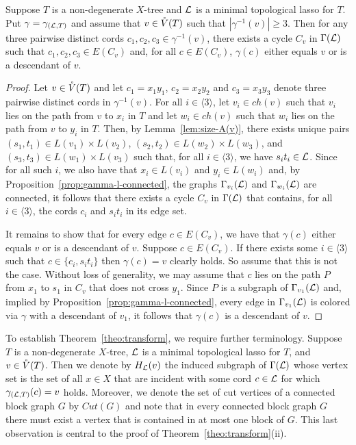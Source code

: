 \begin{lem}\label{lem:3-edges-cycle}
Suppose $T$ is a non-degenerate $X$-tree and ${\mathcal L}$ is a minimal
topological lasso for $T$.  Put $\gamma=\gamma_{({\mathcal L},T)}$ and assume that
$v\in \mathring{V}(T)$ such that $|\gamma^{-1}(v)|\geq 3 $. Then for any three
pairwise distinct cords $c_1,c_2,c_3\in \gamma^{-1}(v)$, 
there exists a 
cycle $C_v$ in $\Gamma({\mathcal L})$ such that $c_1,c_2,c_3\in E(C_v)$ and,  
for all $c\in E(C_v)$,
$\gamma(c)$ either equals $v$ or is a descendant of $v$. 
\end{lem}
\begin{proof}
Let $v\in \mathring{V}(T)$ and let $c_1=x_1y_1$, $c_2=x_2y_2$ and
$c_3=x_3y_3$ denote three pairwise distinct cords in $\gamma^{-1}(v)$. 
For all $i\in\langle 3\rangle$,
let $v_i\in ch(v) $ such that $v_i$ lies on the path from $v$ to $x_i$ in $T$
and let $w_i\in ch(v)$ such that $w_i$ lies on the path from $v$ to
 $y_i$ in $T$.
Then, by Lemma~\ref{lem:size-A(v)},  there exists unique pairs
$(s_1,t_1)\in L(v_1)\times L(v_2)$, 
$(s_2,t_2)\in L(w_2)\times L(w_3)$,
and $(s_3,t_3)\in L(w_1)\times L(v_3)$
such that, for all $i\in\langle 3\rangle$, we have $s_it_i\in {\mathcal L}$.
Since for all such $i$, we also have that $x_i\in L(v_i)$
and $y_i\in L(w_i)$ and, by Proposition~\ref{prop:gamma-l-connected},
the graphs $\Gamma_{v_i}({\mathcal L})$ and $\Gamma_{w_i}({\mathcal L})$
are connected, it follows that there exists a 
cycle $C_v$ in $\Gamma({\mathcal L})$ that contains, for all $i\in\langle 3\rangle$,
the cords $c_i$ and $s_it_i$ in its edge set.

It remains to show that for every edge $c\in E(C_v)$, we have that
$\gamma(c)$ either equals $v$ or is a descendant of $v$. 
Suppose $c\in E(C_v)$.
If there exists some $i\in\langle 3\rangle$ such that $c\in\{c_i,s_it_i\}$
then $\gamma (c)=v$ clearly holds. So assume that
this is not the case. Without loss of generality, we may assume
that $c$ lies on the path $P$ from $x_1$
to $s_1$ in $C_v$ that does not cross $y_1$. Since
$P$ is a subgraph of $\Gamma_{v_1}({\mathcal L})$ and, implied by
Proposition~\ref{prop:gamma-l-connected},
every edge in $\Gamma_{v_1}({\mathcal L})$ is colored via $\gamma$
with a descendant of $v_1$, it follows that
$\gamma(c)$ is a descendant of $v$.
\qquad
\end{proof}

To establish Theorem~\ref{theo:transform}, we require further terminology.
Suppose $T$ is a non-degenerate $X$-tree, ${\mathcal L}$ is a minimal
topological lasso for $T$, and $v\in \mathring{V}(T)$.
Then we denote by $H_{{\mathcal L}}(v)$ the 
induced
subgraph of $\Gamma({\mathcal L})$ whose vertex set is the
set of all $x\in X$ that are incident with some
cord $c\in {\mathcal L}$ for which $\gamma_{({\mathcal L},T)}(c)=v$ holds. 
Moreover, 
 we denote the set of cut vertices of a connected block graph
 $G$ by $Cut(G)$ 
and note that in every connected block graph $G$ there must exist a 
vertex that is contained in at most
one block of $G$. This last observation is
central to the proof of Theorem~\ref{theo:transform}(ii). 

